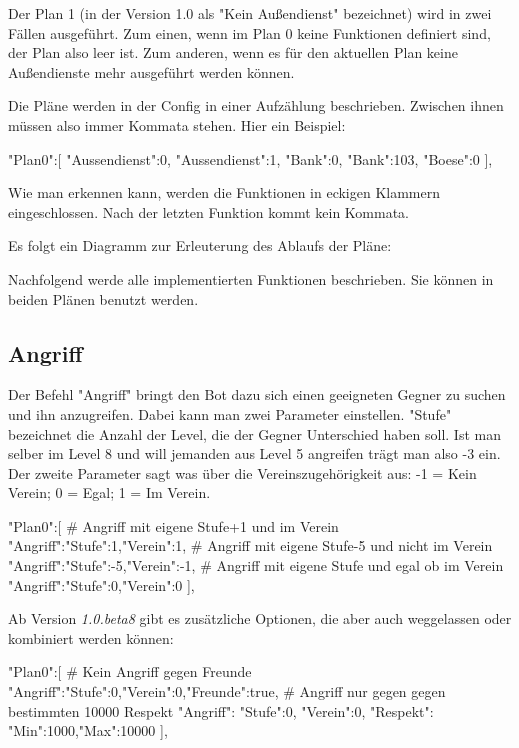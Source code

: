 \documentclass{scrartcl}
\begin{document}
Der Plan 1 (in der Version 1.0 als "Kein Außendienst" bezeichnet) wird in zwei Fällen ausgeführt. Zum einen, wenn im Plan 0 keine Funktionen definiert sind, der Plan also leer ist. Zum anderen, wenn es für den aktuellen Plan keine Außen\-dienste mehr ausgeführt werden können.



Die Pläne werden in der Config in einer Aufzählung beschrieben. Zwischen ihnen müssen also immer Kommata stehen. Hier ein Beispiel:

\begin{code}[language=bash]
"Plan0":[
	{"Aussendienst":0},
	{"Aussendienst":1},
	{"Bank":0},
	{"Bank":103},
	{"Boese":0}
],
\end{code}

Wie man erkennen kann, werden die Funktionen in eckigen Klammern eingeschlossen. Nach der letzten Funktion kommt kein Kommata.

Es folgt ein Diagramm zur Erleuterung des Ablaufs der Pläne:

\resizebox{12cm}{!}{} 


Nachfolgend werde alle implementierten Funktionen beschrieben. Sie können in beiden Plänen benutzt werden. 


\subsection{Angriff}
\label{Angriff}
Der Befehl "Angriff" bringt den Bot dazu sich einen geeigneten Gegner zu suchen und ihn anzugreifen. Dabei kann man zwei Parameter einstellen. "Stufe" bezeichnet die Anzahl der Level, die der Gegner Unterschied haben soll. Ist man selber im Level 8 und will jemanden aus Level 5 angreifen trägt man also -3 ein. Der zweite Parameter sagt was über die Vereinszugehörigkeit aus: -1 = Kein Verein; 0 = Egal; 1 = Im Verein.


\begin{code}[language=bash]
"Plan0":[
# Angriff mit eigene Stufe+1 und im Verein
	{"Angriff":{"Stufe":1,"Verein":1}},
# Angriff mit eigene Stufe-5 und nicht im Verein
	{"Angriff":{"Stufe":-5,"Verein":-1}},
# Angriff mit eigene Stufe und egal ob im Verein
	{"Angriff":{"Stufe":0,"Verein":0}}
],
\end{code}

Ab Version \textit{1.0.beta8} gibt es zusätzliche Optionen, die aber auch weggelassen oder kombiniert werden können:

\begin{code}[language=bash]
"Plan0":[
# Kein Angriff gegen Freunde
	{"Angriff":{"Stufe":0,"Verein":0,"Freunde":true}},
# Angriff nur gegen gegen bestimmten 10000 Respekt
	{"Angriff":{
		"Stufe":0,
		"Verein":0,
		"Respekt":
			{"Min":1000,"Max":10000}
		}
	}
],
\end{code}
\end{document}
